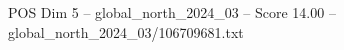 \begin{textsample}{POS Dim 5 – global\_north\_2024\_03 – Score 14.00 – global\_north\_2024\_03/106709681.txt}
\end{textsample}
